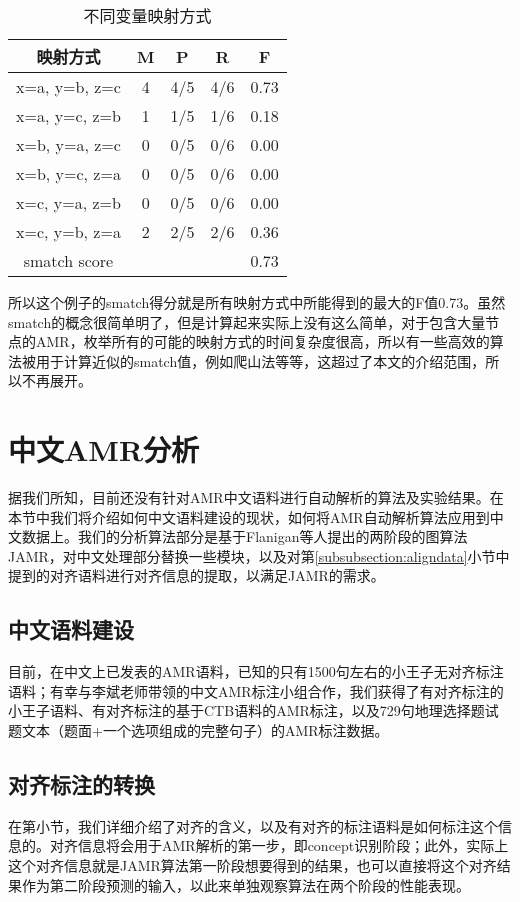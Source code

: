 \documentclass[master, winfont]{njuthesis}
\begin{document}
\begin{table}[!htbp]
\begin{center}
\begin{tabular}{c|c|c|c|c}
\hline {映射方式} & {M} & {P} & {R} & {F} \\
\hline x=a, y=b, z=c & 4 & 4/5 & 4/6 & 0.73 \\
\hline x=a, y=c, z=b & 1 & 1/5 & 1/6 & 0.18 \\
\hline x=b, y=a, z=c & 0 & 0/5 & 0/6 & 0.00 \\
\hline x=b, y=c, z=a & 0 & 0/5 & 0/6 & 0.00 \\
\hline x=c, y=a, z=b & 0 & 0/5 & 0/6 & 0.00 \\
\hline x=c, y=b, z=a & 2 & 2/5 & 2/6 & 0.36 \\
\hline smatch score & \multicolumn{4}{r}{0.73}\\
\hline
\end{tabular}
\end{center}
\caption{\label{smatch_table} 不同变量映射方式}
\end{table}

所以这个例子的smatch得分就是所有映射方式中所能得到的最大的F值0.73。虽然smatch的概念很简单明了，但是计算起来实际上没有这么简单，对于包含大量节点的AMR，枚举所有的可能的映射方式的时间复杂度很高，所以有一些高效的算法被用于计算近似的smatch值，例如爬山法等等，这超过了本文的介绍范围，所以不再展开。

\section{中文AMR分析}
据我们所知，目前还没有针对AMR中文语料进行自动解析的算法及实验结果。在本节中我们将介绍如何中文语料建设的现状，如何将AMR自动解析算法应用到中文数据上。我们的分析算法部分是基于Flanigan等人\cite{Flanigan2014}提出的两阶段的图算法JAMR，对中文处理部分替换一些模块，以及对第\ref{subsubsection:aligndata}小节中提到的对齐语料进行对齐信息的提取，以满足JAMR的需求。

\subsection{中文语料建设}
目前，在中文上已发表的AMR语料，已知的只有1500句左右的小王子无对齐标注语料\cite{Li2016Annotating}；有幸与李斌老师带领的中文AMR标注小组合作，我们获得了有对齐标注的小王子语料、有对齐标注的基于CTB语料的AMR标注，以及729句地理选择题试题文本（题面+一个选项组成的完整句子）的AMR标注数据。

\subsection{对齐标注的转换}
\label{subsection:dataalign}
在第\label{subsubsection:aligndata}小节，我们详细介绍了对齐的含义，以及有对齐的标注语料是如何标注这个信息的。对齐信息将会用于AMR解析的第一步，即concept识别阶段；此外，实际上这个对齐信息就是JAMR算法第一阶段想要得到的结果，也可以直接将这个对齐结果作为第二阶段预测的输入，以此来单独观察算法在两个阶段的性能表现。
\end{document}
